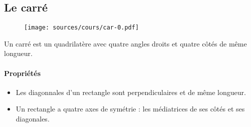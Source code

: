 \documentclass[paper=a4, fontsize=9pt]{scrartcl} %
\begin{document}
\begin{multicols}{3}
  \subsection{Le carré}
  \begin{figure}[H]
    \centering
    \texttt{[image: sources/cours/car-0.pdf]}
  \end{figure}
  
  \begin{Definition}
    Un carré est un quadrilatère avec quatre angles droits et quatre côtés de même longueur.
  \end{Definition}

  \paragraph{Propriétés}
  \begin{itemize}[label=$\Diamond$]
  \item Les diagonnales d'un rectangle sont perpendiculaires et de même longueur.
  \item Un rectangle a quatre axes de symétrie : les médiatrices de ses côtés et ses diagonales.
  \end{itemize}
\end{multicols}
\end{document}
